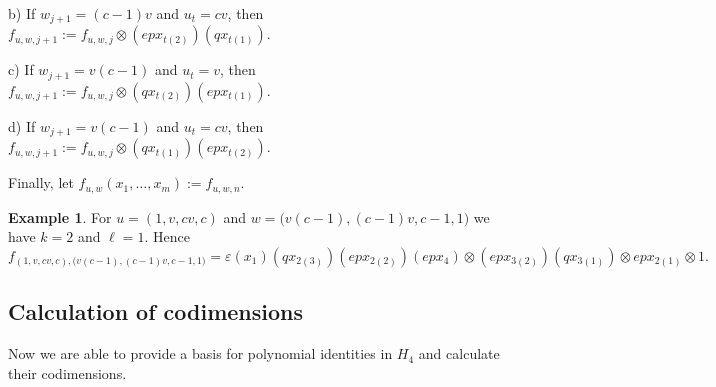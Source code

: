 \documentclass[12pt, reqno, a4paper]{amsart}
\theoremstyle{plain}
\theoremstyle{remark}
\theoremstyle{definition}
\newtheorem{example}[theorem]{Example}
\numberwithin{equation}{section}
\begin{document}
b) If $w_{j+1} = (c-1)v$ and $u_t = cv$, 
then $f_{u,w,j+1} := f_{u,w,j} \otimes (epx_{t(2)})(qx_{t(1)})$.

c) If $w_{j+1} = v(c-1)$ and $u_t = v$, 
then $f_{u,w,j+1} := f_{u,w,j} \otimes (qx_{t(2)})(epx_{t(1)})$.

d) If $w_{j+1} = v(c-1)$ and $u_t = cv$, 
then $f_{u,w,j+1} := f_{u,w,j} \otimes (qx_{t(1)})(epx_{t(2)})$.

Finally, let $f_{u,w}(x_1, \ldots, x_m) := f_{u,w,n}$. 


\begin{example} For $u = (1,v,cv,c)$ and $w = \bigl(v(c-1), (c-1)v, c-1, 1\bigr)$  we have $k=2$ and $\ell = 1$. Hence
	$$f_{(1,v,cv,c),\bigl(v(c-1), (c-1)v, c-1, 1\bigr)}
	=  \varepsilon(x_1) (qx_{2(3)})(epx_{2(2)})(epx_4) \otimes (epx_{3(2)})(qx_{3(1)}) \otimes epx_{2(1)} \otimes 1.$$
\end{example}

\subsection{Calculation of codimensions}
Now we are able to provide a basis for polynomial identities in $H_4$ and calculate their codimensions. 
\end{document}
